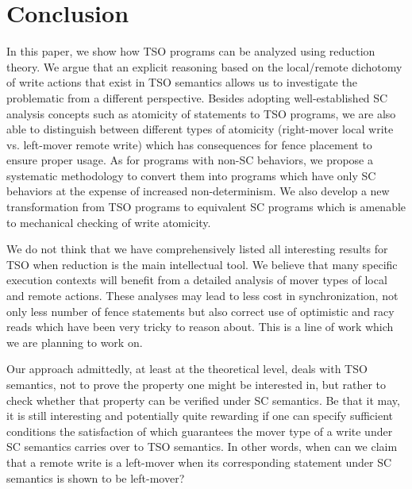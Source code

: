 \documentclass[preprint,9pt]{sigplanconf}
\begin{document}






\section{Conclusion}
In this paper, we show how TSO programs can be analyzed using reduction theory.
We argue that an explicit reasoning based on the local/remote dichotomy of write actions that exist in TSO semantics allows us to investigate the problematic from a different perspective. 
Besides adopting well-established SC analysis concepts such as atomicity of statements to TSO programs, we are also able to distinguish between different types of atomicity (right-mover local write vs. left-mover remote write) which has consequences for fence placement to ensure proper usage.
As for programs with non-SC behaviors, we propose a systematic methodology to convert them into programs which have only SC behaviors at the expense of increased non-determinism.
We also develop a new transformation from TSO programs to equivalent SC programs which is amenable to mechanical checking of write atomicity.

We do not think that we have comprehensively listed all interesting results for TSO when reduction is the main intellectual tool.
We believe that many specific execution contexts will benefit from a detailed analysis of mover types of local and remote actions.
These analyses may lead to less cost in synchronization, not only less number of fence statements but also correct use of optimistic and racy reads which have been very tricky to reason about. 
This is a line of work which we are planning to work on.

Our approach admittedly, at least at the theoretical level, deals with TSO semantics, not to prove the property one might be interested in, but rather to check whether that property can be verified under SC semantics.
Be that it may, it is still interesting and potentially quite rewarding if one can specify sufficient conditions the satisfaction of which guarantees the mover type of a write under SC semantics carries over to TSO semantics.
In other words, when can we claim that a remote write is a left-mover when its corresponding statement under SC semantics is shown to be left-mover?
\end{document}
